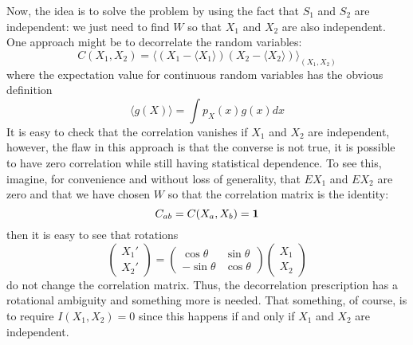\documentclass[12pt]{article}
\begin{document}
Now, the idea is to solve the problem by using the fact that $S_1$ and
$S_2$ are independent: we just need to find $W$ so that $X_1$ and
$X_2$ are also independent. One approach might be to decorrelate the
random variables:
\begin{equation}
C(X_1,X_2)=\langle(X_1-\langle X_1\rangle)(X_2-\langle X_2\rangle)\rangle_{(X_1,X_2)}
\end{equation}
where the expectation value for continuous random variables has the obvious definition
\begin{equation}
\langle g(X)\rangle =\int p_X(x)g(x) dx
\end{equation}
It is easy to check that the correlation vanishes if $X_1$ and $X_2$
are independent, however, the flaw in this approach is that the
converse is not true, it is possible to have zero correlation while
still having statistical dependence. To see this, imagine, for
convenience and without loss of generality, that $EX_1$ and $EX_2$ are
zero and that we have chosen $W$ so that the correlation matrix is the
identity:
\begin{equation}
C_{ab}=C(X_a,X_b)={\bf 1}
\end{equation}
then it is easy to see that rotations
\begin{equation}
\left(\begin{array}{c}X_1'\\X_2'\end{array}\right)=\left(\begin{array}{cc}\cos{\theta}&\sin{\theta}\\-\sin{\theta}&\cos{\theta}\end{array}\right)\left(\begin{array}{c}X_1\\X_2\end{array}\right)
\end{equation}
do not change the correlation matrix. Thus, the decorrelation
prescription has a rotational ambiguity and something more is
needed. That something, of course, is to require $I(X_1,X_2)=0$ since
this happens if and only if $X_1$ and $X_2$ are independent.
\end{document}
